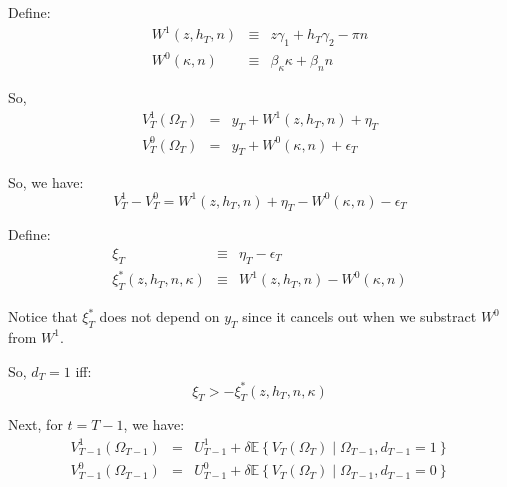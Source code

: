 \noindent Define:
\begin{eqnarray*}
W^1 \left(z,h_T,n\right) & \equiv & z \gamma_1 + h_T \gamma_2 - \pi n\\
W^0 \left(\kappa,n\right) & \equiv & \beta_\kappa \kappa + \beta_n n
\end{eqnarray*}

\noindent So, 
\begin{eqnarray*}
V_T^1\left(\Omega_T\right) &=& y_T + W^1\left(z,h_T,n\right) + \eta_T \\
V_T^0\left(\Omega_T\right) &=& y_T + W^0\left(\kappa,n\right) + \epsilon_T
\end{eqnarray*}

\noindent So, we have:
\begin{equation*}
V^1_T - V^0_T =  W^1\left(z,h_T,n\right) + \eta_T -   W^0\left(\kappa,n\right) - \epsilon_T
\end{equation*}

\noindent Define:
\begin{eqnarray*}
\xi_T & \equiv & \eta_T - \epsilon_T \\
\xi^{*}_T\left(z,h_T,n,\kappa\right) & \equiv & W^1\left(z,h_T,n\right) - W^0\left(\kappa,n\right)
\end{eqnarray*}

\noindent Notice that $\xi_T^*$ does not depend on $y_T$ since it cancels out when we substract $W^0$ from $W^1$. 

\noindent So, $d_T=1$ iff:
\begin{equation*}
\xi_T > -\xi^{*}_T\left(z,h_T,n,\kappa\right)
\end{equation*} 

\noindent Next, for $t = T-1$, we have:
\begin{eqnarray*}
V^{1}_{T-1}\left(\Omega_{T-1}\right) &=& U^{1}_{T-1} + 
\delta \mathbb{E} \left\{ V_T\left(\Omega_T\right) \middle| \Omega_{T-1}, d_{T-1}=1\right\} \\
V^{0}_{T-1}\left(\Omega_{T-1}\right) &=& U^{0}_{T-1} + 
\delta \mathbb{E} \left\{ V_T\left(\Omega_T\right) \middle| \Omega_{T-1}, d_{T-1}=0\right\}
\end{eqnarray*}

